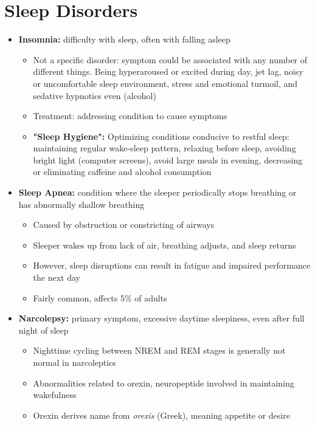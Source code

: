\documentclass{article}
\begin{document}
\section{Sleep Disorders}
\begin{itemize}
    \item \textbf{Insomnia:} difficulty with sleep, often with falling asleep
    \begin{itemize}
        \item Not a specific disorder: symptom could be associated with any number of different things. Being hyperaroused or excited during day, jet lag, noisy or uncomfortable sleep environment, stress and emotional turmoil, and sedative hypnotics even (alcohol) 
        \item Treatment: addressing condition to cause symptoms
        \item  \textbf{"Sleep Hygiene":} Optimizing conditions conducive to restful sleep: maintaining regular wake-sleep pattern, relaxing before sleep, avoiding bright light (computer screens), avoid large meals in evening, decreasing or eliminating caffeine and alcohol consumption
    \end{itemize}
    \item \textbf{Sleep Apnea:} condition where the sleeper periodically stops breathing or has abnormally shallow breathing
        \begin{itemize}
            \item Caused by obstruction or constricting of airways
            \item Sleeper wakes up from lack of air, breathing adjusts, and sleep returns
            \item However, sleep disruptions can result in fatigue and impaired performance the next day
            \item Fairly common, affects 5\% of adults
        \end{itemize}
    \item \textbf{Narcolepsy:} primary symptom, excessive daytime sleepiness, even after full night of sleep
        \begin{itemize}
            \item Nighttime cycling between NREM and REM stages is generally not normal in narcoleptics 
            \item Abnormalities related to orexin, neuropeptide involved in maintaining wakefulness
            \item Orexin derives name from \textit{orexis} (Greek), meaning appetite or desire

\end{itemize}
\end{itemize}
\end{document}
